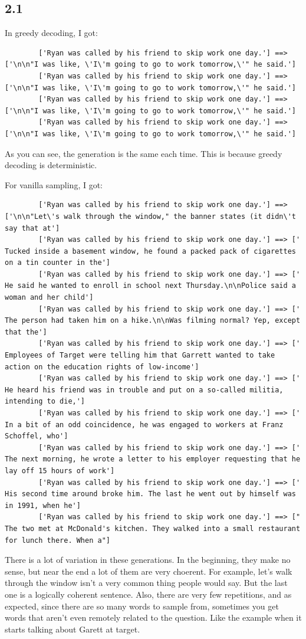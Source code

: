 \documentclass[12pt]{article}
\theoremstyle{definitionstyle}
\begin{document}
    \subsection*{2.1}
    In greedy decoding, I got:
    \begin{lstlisting}
        ['Ryan was called by his friend to skip work one day.'] ==> ['\n\n"I was like, \'I\'m going to go to work tomorrow,\'" he said.']
        ['Ryan was called by his friend to skip work one day.'] ==> ['\n\n"I was like, \'I\'m going to go to work tomorrow,\'" he said.']
        ['Ryan was called by his friend to skip work one day.'] ==> ['\n\n"I was like, \'I\'m going to go to work tomorrow,\'" he said.']
        ['Ryan was called by his friend to skip work one day.'] ==> ['\n\n"I was like, \'I\'m going to go to work tomorrow,\'" he said.']
    \end{lstlisting}
    As you can see, the generation is the same each time. This is because greedy decoding is deterministic. 

    For vanilla sampling, I got:
    \begin{lstlisting}
        ['Ryan was called by his friend to skip work one day.'] ==> ['\n\n"Let\'s walk through the window," the banner states (it didn\'t say that at']
        ['Ryan was called by his friend to skip work one day.'] ==> [' Tucked inside a basement window, he found a packed pack of cigarettes on a tin counter in the']
        ['Ryan was called by his friend to skip work one day.'] ==> [' He said he wanted to enroll in school next Thursday.\n\nPolice said a woman and her child']
        ['Ryan was called by his friend to skip work one day.'] ==> [' The person had taken him on a hike.\n\nWas filming normal? Yep, except that the']
        ['Ryan was called by his friend to skip work one day.'] ==> [' Employees of Target were telling him that Garrett wanted to take action on the education rights of low-income']
        ['Ryan was called by his friend to skip work one day.'] ==> [' He heard his friend was in trouble and put on a so-called militia, intending to die,']
        ['Ryan was called by his friend to skip work one day.'] ==> [' In a bit of an odd coincidence, he was engaged to workers at Franz Schoffel, who']
        ['Ryan was called by his friend to skip work one day.'] ==> [' The next morning, he wrote a letter to his employer requesting that he lay off 15 hours of work']
        ['Ryan was called by his friend to skip work one day.'] ==> [' His second time around broke him. The last he went out by himself was in 1991, when he']
        ['Ryan was called by his friend to skip work one day.'] ==> [" The two met at McDonald's kitchen. They walked into a small restaurant for lunch there. When a"]
    \end{lstlisting}
    There is a lot of variation in these generations. In the beginning, they make no sense, but near the end a lot of them are very choerent. For example, let's walk through the window isn't a very common thing people would say. But the last one is a logically coherent sentence. Also, there are very few repetitions, and as expected, since there are so many words to sample from, sometimes you get words that aren't even remotely related to the question. Like the example when it starts talking about Garett at target. 
\end{document}
